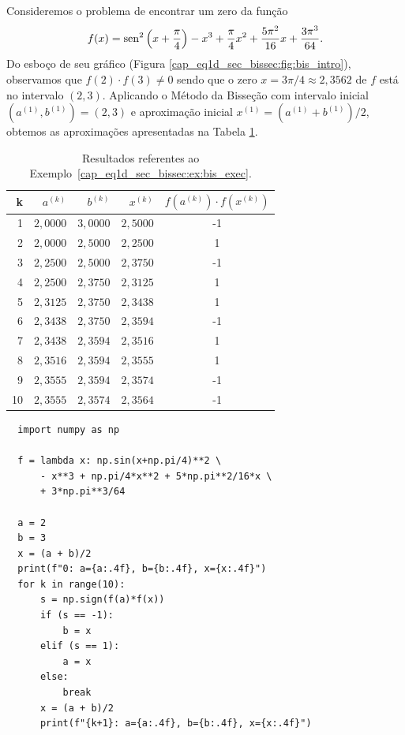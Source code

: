 \begin{ex}\label{cap_eq1d_sec_bissec:ex:bis_exec}
  Consideremos o problema de encontrar um zero da função
\begin{equation}
  f(x) = \operatorname{sen}^2\left(x+\frac{\pi}{4}\right) - x^3 + \frac{\pi}{4}x^2 + \frac{5\pi^2}{16}x + \frac{3\pi^3}{64}.
\end{equation}
Do esboço de seu gráfico (Figura \ref{cap_eq1d_sec_bissec:fig:bis_intro}), observamos que $f(2)\cdot f(3) \neq 0$ sendo que o zero $x=3\pi/4\approx 2,3562$ de $f$ está no intervalo $(2, 3)$. Aplicando o Método da Bisseção com intervalo inicial $(a^{(1)}, b^{(1)}) = (2, 3)$ e aproximação inicial $x^{(1)} = (a^{(1)}+b^{(1)})/2$, obtemos as aproximações apresentadas na Tabela \ref{cap_eq1d_sec_bissec:tab:bis_exec}.

\begin{table}[h!]
  \centering
  \caption{Resultados referentes ao Exemplo~\ref{cap_eq1d_sec_bissec:ex:bis_exec}.}
  \begin{tabular}{r|rr|r|c}
    k & $a^{(k)}$ & $b^{(k)}$ & $x^{(k)}$ & $f(a^{(k)})\cdot f(x^{(k)})$\\\hline
    1 & $2,0000$ & $3,0000$ & $2,5000$ & -1 \\
    2 & $2,0000$ & $2,5000$ & $2,2500$ &  1 \\
    3 & $2,2500$ & $2,5000$ & $2,3750$ & -1 \\
    4 & $2,2500$ & $2,3750$ & $2,3125$ & 1 \\
    5 & $2,3125$ & $2,3750$ & $2,3438$ & 1 \\
    6 & $2,3438$ & $2,3750$ & $2,3594$ &  -1 \\
    7 & $2,3438$ & $2,3594$ & $2,3516$ & 1 \\
    8 & $2,3516$ & $2,3594$ & $2,3555$ &  1 \\
    9 & $2,3555$ & $2,3594$ & $2,3574$ &  -1 \\
    10 & $2,3555$ & $2,3574$ & $2,3564$ & -1 \\\hline
  \end{tabular}
  \label{cap_eq1d_sec_bissec:tab:bis_exec}
\end{table}

\begin{lstlisting}
  import numpy as np

  f = lambda x: np.sin(x+np.pi/4)**2 \
      - x**3 + np.pi/4*x**2 + 5*np.pi**2/16*x \
      + 3*np.pi**3/64

  a = 2
  b = 3
  x = (a + b)/2
  print(f"0: a={a:.4f}, b={b:.4f}, x={x:.4f}")
  for k in range(10):
      s = np.sign(f(a)*f(x))
      if (s == -1):
          b = x
      elif (s == 1):
          a = x
      else:
          break
      x = (a + b)/2
      print(f"{k+1}: a={a:.4f}, b={b:.4f}, x={x:.4f}")
\end{lstlisting}
\end{ex}

